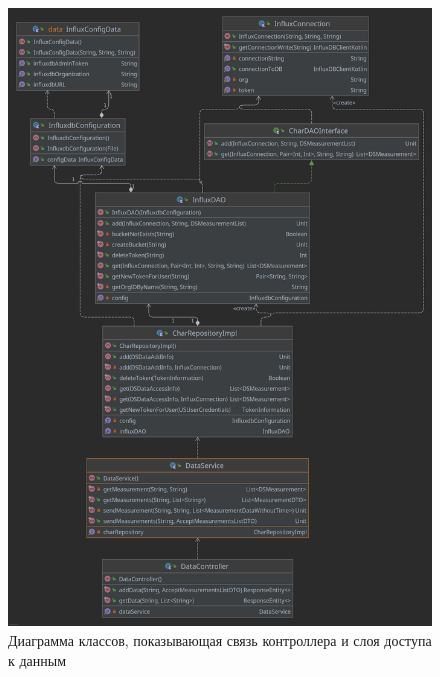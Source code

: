 \begin{figure}[hbtp]
	\centering
	\includegraphics[width=\textwidth]{img/dataAndControllerLinkageDiagram.png}
	\caption{Диаграмма классов, показывающая связь контроллера и слоя доступа к данным}
	\label{fig:dataAndController}
\end{figure}

